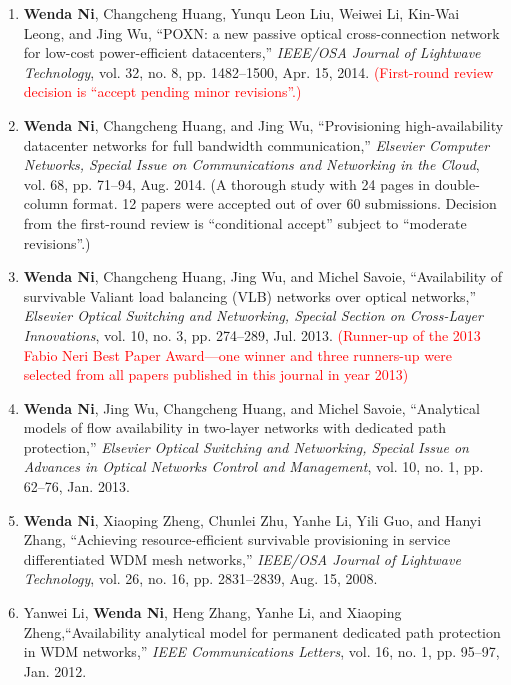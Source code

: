 \documentclass[letterpaper,11pt]{article}
\begin{document}
\begin{CJK}{UTF8}{gbsn}
\begin{enumerate}
\item
\textbf{Wenda Ni}, Changcheng Huang, Yunqu Leon Liu, Weiwei Li, Kin-Wai Leong, and Jing Wu, ``POXN: a new passive optical cross-connection network for low-cost power-efficient datacenters,'' \textit{IEEE/OSA Journal of Lightwave Technology}, vol. 32, no. 8, pp. 1482--1500, Apr. 15, 2014.
\textcolor{Red}{(First-round review decision is ``accept pending minor revisions''.)}

\item
\textbf{Wenda Ni}, Changcheng Huang, and Jing Wu, ``Provisioning high-availability datacenter networks for full bandwidth communication,'' \textit{Elsevier Computer Networks, Special Issue on Communications and Networking in the Cloud}, vol. 68, pp. 71--94, Aug. 2014.
(A thorough study with 24 pages in double-column format. 12 papers were accepted out of over 60 submissions. Decision from the first-round review is ``conditional accept'' subject to ``moderate revisions''.)

\item
\textbf{Wenda Ni}, Changcheng Huang, Jing Wu, and Michel Savoie, ``Availability of survivable Valiant load balancing (VLB) networks over optical networks,'' \textit{Elsevier Optical Switching and Networking, Special Section on Cross-Layer Innovations}, vol. 10, no. 3, pp. 274--289, Jul. 2013. \textcolor{Red}{(Runner-up of the 2013 Fabio Neri Best Paper Award---one winner and three runners-up were selected from all papers published in this journal in year 2013)}

\item
\textbf{Wenda Ni}, Jing Wu, Changcheng Huang, and Michel Savoie, ``Analytical models of flow availability in two-layer networks with dedicated path protection,'' \textit{Elsevier Optical Switching and Networking, Special Issue on Advances in Optical Networks Control and Management}, vol. 10, no. 1, pp. 62--76, Jan. 2013.

\item
\textbf{Wenda Ni}, Xiaoping Zheng, Chunlei Zhu, Yanhe Li, Yili Guo, and Hanyi Zhang, ``Achieving resource-efficient survivable provisioning in service differentiated WDM mesh networks,'' \textit{IEEE/OSA Journal of Lightwave Technology}, vol. 26, no. 16, pp. 2831--2839, Aug. 15, 2008.

\item
Yanwei Li, \textbf{Wenda Ni}, Heng Zhang, Yanhe Li, and Xiaoping Zheng,``Availability analytical model for permanent dedicated path protection in WDM networks,'' \textit{IEEE Communications Letters}, vol. 16, no. 1, pp. 95--97, Jan. 2012.


\end{enumerate}
\end{CJK}
\end{document}
